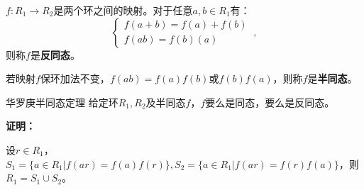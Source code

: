 
\begin{definition}{}
$f:R_1\rightarrow R_2$是两个环之间的映射。对于任意$a,b\in R_1$有：
\begin{equation}
\left\{\begin{array}{c}
f(a+b)=f(a)+f(b) \\
f(a b)=f(b) (a)
\end{array}\right.
~,\end{equation}
则称$f$是\textbf{反同态}。

若映射$f$保环加法不变，$f(ab)=f(a)f(b)$或$f(b)f(a)$，则称$f$是\textbf{半同态}。
\end{definition}
\begin{theorem}{华罗庚半同态定理}
给定环$R_1,R_2$及半同态$f$，$f$要么是同态，要么是反同态。
\end{theorem}
\textbf{证明：}

设$r\in R_1$，$S_1=\{a\in R_1|f(ar)=f(a)f(r)\},S_2=\{a\in R_1|f(ar)=f(r)f(a)\}$，则$R_1=S_1\cup S_2$。

